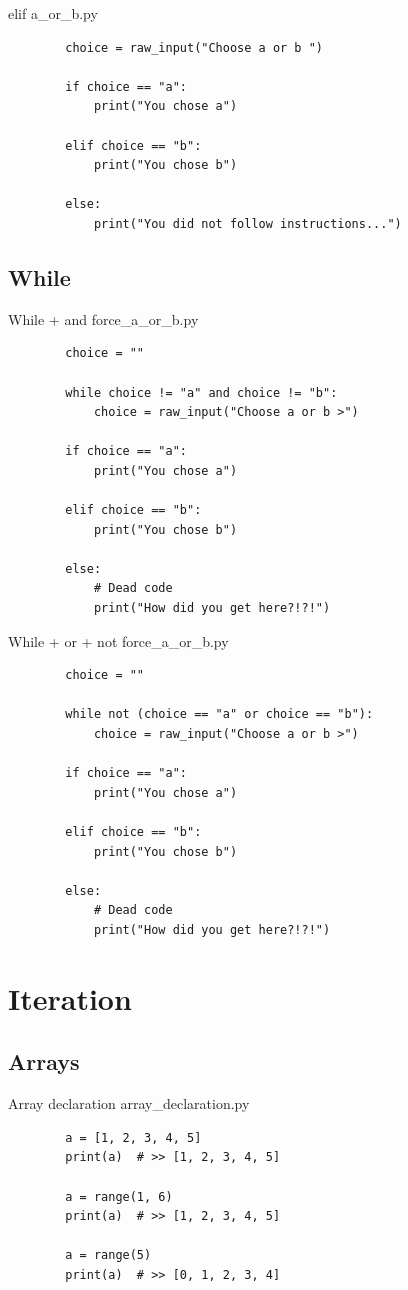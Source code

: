\documentclass[11pt]{beamer}
\begin{document}
\begin{frame}[fragile]{elif}
	a\_or\_b.py
	\begin{lstlisting}
		choice = raw_input("Choose a or b ")
		
		if choice == "a":
		    print("You chose a")
		
		elif choice == "b":
		    print("You chose b")
		
		else:
		    print("You did not follow instructions...")
	\end{lstlisting}
\end{frame}

\subsection{While}
\begin{frame}[fragile]{While + and}
	force\_a\_or\_b.py
	\begin{lstlisting}
		choice = ""
		
		while choice != "a" and choice != "b":
			choice = raw_input("Choose a or b >")
		
		if choice == "a":
		    print("You chose a")
		
		elif choice == "b":
		    print("You chose b")
		
		else:
		    # Dead code
		    print("How did you get here?!?!")
	\end{lstlisting}
\end{frame}

\begin{frame}[fragile]{While + or + not}
	force\_a\_or\_b.py
	\begin{lstlisting}
		choice = ""
		
		while not (choice == "a" or choice == "b"):
			choice = raw_input("Choose a or b >")
		
		if choice == "a":
		    print("You chose a")
		
		elif choice == "b":
		    print("You chose b")
		
		else:
		    # Dead code
		    print("How did you get here?!?!")
	\end{lstlisting}
\end{frame}

\section{Iteration}
\subsection{Arrays}
\begin{frame}[fragile]{Array declaration}
	array\_declaration.py
	\begin{lstlisting}
		a = [1, 2, 3, 4, 5]
		print(a)  # >> [1, 2, 3, 4, 5]
		
		a = range(1, 6)
		print(a)  # >> [1, 2, 3, 4, 5]
		
		a = range(5)
		print(a)  # >> [0, 1, 2, 3, 4]
	\end{lstlisting}
\end{frame}
\end{document}

